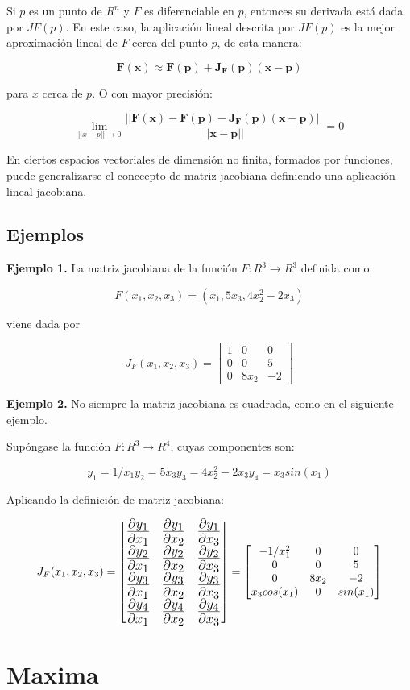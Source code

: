 Si $p$ es un punto de $R^n$ y $F$ es diferenciable en $p$, entonces su derivada está dada por $JF(p)$. En este caso, la aplicación lineal descrita por $JF(p)$ es la mejor aproximación lineal de $F$ cerca del punto $p$, de esta manera:

$$
\mathbf{F(x) \approx F(p) + J_F(p)(x-p)}
$$

para $x$ cerca de $p$. O con mayor precisión:

$$
\lim\limits_{||x-p|| \to 0}\frac{||\mathbf{F(x) - F(p) -J_F(p)(x-p)||}}{\mathbf{||x-p||}}=0
$$


En ciertos espacios vectoriales de dimensión no finita, formados por funciones, puede generalizarse el conccepto de matriz jacobiana definiendo una aplicación lineal jacobiana.

\subsection{Ejemplos}

\noindent\textbf{Ejemplo 1.} La matriz jacobiana de la función $F \colon R^3 \rightarrow R^3$ definida como:

$$
F(x_1, x_2, x_3) = (x_1, 5x_3, 4x_2^2 - 2x_3)
$$

viene dada por

$$
J_F(x_1, x_2, x_3) =
\begin{bmatrix}
1 & 0 & 0 \\
0 & 0 & 5 \\
0 & 8x_2 & -2
\end{bmatrix}
$$


\noindent\textbf{Ejemplo 2.} No siempre la matriz jacobiana es cuadrada, como en el siguiente ejemplo.


Supóngase la función $F \colon R^3 \rightarrow R^4$, cuyas componentes son:

$$
y_1 = 1/x_1
y_2 = 5x_3
y_3 = 4x_2^2 - 2x_3
y_4 = x_3sin(x_1)
$$

Aplicando la definición de matriz jacobiana:

\begin{equation*}
J_F(x_1, x_2, x_3) = 
{\LARGE\begin{bmatrix}
\frac{\partial y_1}{\partial x_1} & \frac{\partial y_1}{\partial x_2} & \frac{\partial y_1}{\partial x_3} \\
\frac{\partial y_2}{\partial x_1} & \frac{\partial y_2}{\partial x_2} & \frac{\partial y_2}{\partial x_3} \\
\frac{\partial y_3}{\partial x_1} & \frac{\partial y_3}{\partial x_2} & \frac{\partial y_3}{\partial x_3} \\
\frac{\partial y_4}{\partial x_1} & \frac{\partial y_4}{\partial x_2} & \frac{\partial y_4}{\partial x_3} 
\end{bmatrix}}
=
\begin{bmatrix}
-1/x_1^2 & 0 & 0 \\
0 & 0 & 5 \\
0 & 8x_2 & -2 \\
x_3cos(x_1) & 0 & sin(x_1)
\end{bmatrix}
\end{equation*}

\section{Maxima}
